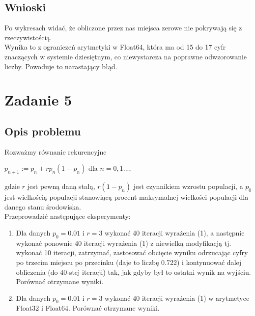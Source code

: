 \documentclass{article}
\begin{document}
\subsection*{Wnioski}
	Po wykresach widać, że obliczone przez nas miejsca zerowe nie pokrywają się z rzeczywistością. \\
	Wynika to z ograniczeń arytmetyki w Float64, która ma od 15 do 17 cyfr znaczących w systemie dziesiętnym, co niewystarcza na poprawne odwzorowanie liczby.
	Powoduje to narastający błąd.

\section*{Zadanie 5}
\subsection*{Opis problemu}
	Rozważmy równanie rekurencyjne \\
	\centerline{$p_{n+1} := p_n + rp_n(1 - p_n)$ dla $n = 0, 1...,$ \\}
	gdzie $r$ jest pewną daną stałą, $r(1 - p_n)$ jest czynnikiem wzrostu populacji, a $p_0$ jest wielkością populacji stanowiącą procent maksymalnej wielkości populacji dla danego stanu środowiska. \\
	Przeprowadzić następujące eksperymenty:
	\begin{enumerate}
        \item Dla danych $p_0 = 0.01$ i $r = 3$ wykonać 40 iteracji wyrażenia (1), a następnie wykonać ponownie 40 iteracji wyrażenia (1) z niewielką modyfikacją tj. wykonać 10 iteracji, zatrzymać, zastosować obcięcie wyniku odrzucając cyfry po trzecim miejscu po przecinku (daje to liczbę 0.722) i kontynuować dalej obliczenia (do 40-stej iteracji) tak, jak gdyby był to ostatni wynik na wyjściu. Porównać otrzymane wyniki.
        \item Dla danych $p_0 = 0.01$ i $r = 3$ wykonać 40 iteracji wyrażenia (1) w arytmetyce Float32 i Float64. Porównać otrzymane wyniki.
    \end{enumerate}
\end{document}
